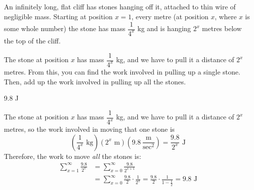 \subsection*{\Application}
\begin{question}
An infinitely long, flat cliff has stones hanging off it, attached to thin wire of negligible mass. Starting at position $x=1$, every metre (at position $x$, where $x$ is some whole number) the stone has mass $\dfrac{1}{4^x}$ kg and is hanging $2^x$ metres  below the top of the cliff.

\begin{center}\end{center}
\end{question}
\begin{hint}
The stone at position $x$ has mass $\dfrac{1}{4^x}$ kg, and we have to pull it a distance of $2^x$ metres. From this, you can find the work involved in pulling up a single stone. Then, add up the work involved in pulling up all the stones.
\end{hint}
\begin{answer}
9.8 J
\end{answer}
\begin{solution}
The stone at position $x$ has mass $\dfrac{1}{4^x}$ kg, and we have to pull it a distance of $2^x$ metres, so the work involved in moving that one stone is
\[\left(\frac{1}{4^x}\text{ kg}\right)\left(2^x\text{ m}\right)\left(9.8 ~\frac{\text{m}}{\text{sec}^2}\right) = \frac{9.8}{2^x}\text{ J}\]
Therefore, the work to move \emph{all} the stones is:
\begin{align*}
\sum_{x=1}^{\infty}\frac{9.8}{2^x}&
=\sum_{x=0}^{\infty}\frac{9.8}{2^{x+1}}\\
&=\sum_{x=0}^{\infty}\frac{9.8}{2}\cdot\frac{1}{2^{x}}
=\frac{9.8}{2}\cdot\frac{1}{1-\frac12}=9.8 \text{ J}
\end{align*}
\end{solution}


